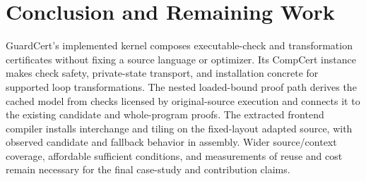 \section{Conclusion and Remaining Work}

GuardCert's implemented kernel composes executable-check and transformation
certificates without fixing a source language or optimizer. Its CompCert instance
makes check safety, private-state transport, and installation concrete for
supported loop transformations. The nested loaded-bound proof path derives
the cached model from checks licensed by original-source execution and connects
it to the existing candidate and whole-program proofs. The extracted frontend
compiler installs interchange and tiling on the fixed-layout adapted source,
with observed candidate and fallback behavior in assembly. Wider source/context
coverage, affordable sufficient conditions, and measurements of reuse and cost
remain necessary for the final case-study and contribution claims.
